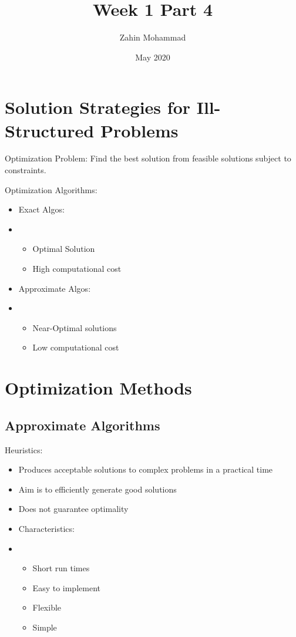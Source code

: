 \documentclass{article}
\title{Week 1 Part 4}
\author{Zahin Mohammad}
\date{May 2020}
\begin{document}
\maketitle
\section{Solution Strategies for Ill-Structured Problems}
    Optimization Problem: Find the best solution from feasible solutions subject to constraints.

    Optimization Algorithms:
    \begin{itemize}
        \item Exact Algos:
        \item  \begin{itemize}
            \item Optimal Solution
            \item High computational cost
        \end{itemize}
        \item Approximate Algos:
        \item \begin{itemize}
            \item Near-Optimal solutions
            \item Low computational cost
        \end{itemize}
    \end{itemize}

\section{Optimization Methods}
\subsection{Approximate Algorithms}
    Heuristics:
    \begin{itemize}
        \item Produces acceptable solutions to complex problems in a practical time
        \item Aim is to efficiently generate good solutions
        \item Does not guarantee optimality
        \item Characteristics:
        \item \begin{itemize}
            \item Short run times
            \item Easy to implement
            \item Flexible
            \item Simple
        \end{itemize}
    \end{itemize}
    
\end{document}
